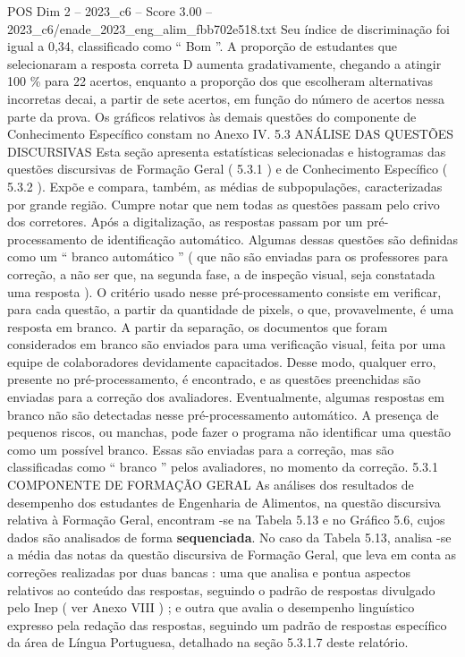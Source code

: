 \begin{textsample}{POS Dim 2 – 2023\_c6 – Score 3.00 – 2023\_c6/enade\_2023\_eng\_alim\_fbb702e518.txt}
Seu índice de discriminação foi igual a 0,34, classificado como “ Bom ”.
A proporção de estudantes que selecionaram a resposta correta D aumenta gradativamente, chegando a atingir 100 \% para 22 acertos, enquanto a proporção dos que escolheram alternativas incorretas decai, a partir de sete acertos, em função do número de acertos nessa parte da prova.
Os gráficos relativos às demais questões do componente de Conhecimento Específico constam no Anexo IV. 5.3 ANÁLISE DAS QUESTÕES DISCURSIVAS Esta seção apresenta estatísticas selecionadas e histogramas das questões discursivas de Formação Geral ( 5.3.1 ) e de Conhecimento Específico ( 5.3.2 ).
Expõe e compara, também, as médias de subpopulações, caracterizadas por grande região.
Cumpre notar que nem todas as questões passam pelo crivo dos corretores.
Após a digitalização, as respostas passam por um pré-processamento de identificação automático.
Algumas dessas questões são definidas como um “ branco automático ” ( que não são enviadas para os professores para correção, a não ser que, na segunda fase, a de inspeção visual, seja constatada uma resposta ).
O critério usado nesse pré-processamento consiste em verificar, para cada questão, a partir da quantidade de pixels, o que, provavelmente, é uma resposta em branco.
A partir da separação, os documentos que foram considerados em branco são enviados para uma verificação visual, feita por uma equipe de colaboradores devidamente capacitados.
Desse modo, qualquer erro, presente no pré-processamento, é encontrado, e as questões preenchidas são enviadas para a correção dos avaliadores.
Eventualmente, algumas respostas em branco não são detectadas nesse pré-processamento automático.
A presença de pequenos riscos, ou manchas, pode fazer o programa não identificar uma questão como um possível branco.
Essas são enviadas para a correção, mas são classificadas como “ branco ” pelos avaliadores, no momento da correção. 5.3.1 COMPONENTE DE FORMAÇÃO GERAL As análises dos resultados de desempenho dos estudantes de Engenharia de Alimentos, na questão discursiva relativa à Formação Geral, encontram -se na Tabela 5.13 e no Gráfico 5.6, cujos dados são analisados de forma \textbf{sequenciada}.
No caso da Tabela 5.13, analisa -se a média das notas da questão discursiva de Formação Geral, que leva em conta as correções realizadas por duas bancas : uma que analisa e pontua aspectos relativos ao conteúdo das respostas, seguindo o padrão de respostas divulgado pelo Inep ( ver Anexo VIII ) ; e outra que avalia o desempenho linguístico expresso pela redação das respostas, seguindo um padrão de respostas específico da área de Língua Portuguesa, detalhado na seção 5.3.1.7 deste relatório.

\end{textsample}
